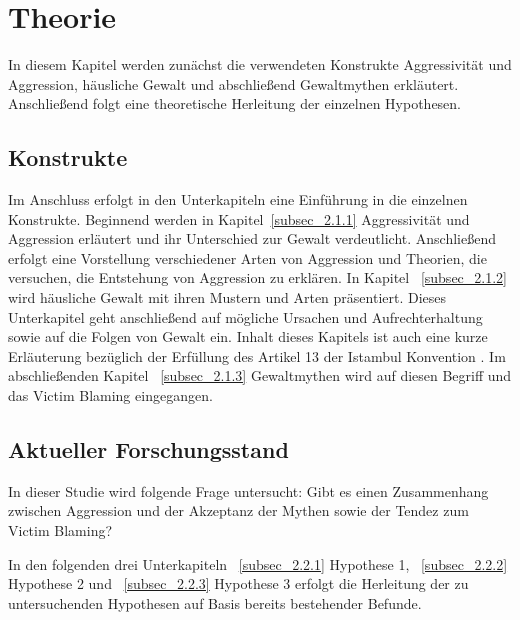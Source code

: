 

\chapter{Theorie}   \label{ch_2}
In diesem Kapitel werden zunächst die verwendeten Konstrukte Aggressivität und Aggression, häusliche Gewalt und abschließend Gewaltmythen erkläutert. Anschließend folgt eine theoretische Herleitung der einzelnen Hypothesen.

\section{Konstrukte}    \label{sec_2.1}
Im Anschluss erfolgt in den Unterkapiteln eine Einführung in die einzelnen Konstrukte. Beginnend werden in Kapitel~\ref{subsec_2.1.1} Aggressivität und Aggression erläutert und ihr Unterschied zur Gewalt verdeutlicht. Anschließend erfolgt eine Vorstellung verschiedener Arten von Aggression und Theorien, die versuchen, die Entstehung von Aggression zu erklären. In Kapitel ~\ref{subsec_2.1.2} wird häusliche Gewalt mit ihren Mustern und Arten präsentiert. Dieses Unterkapitel geht anschließend auf mögliche Ursachen und Aufrechterhaltung sowie auf die Folgen von Gewalt ein. Inhalt dieses Kapitels ist auch eine kurze Erläuterung bezüglich der Erfüllung des Artikel 13 der Istambul Konvention \parencite{Istambul_Konvention}. Im abschließenden Kapitel ~\ref{subsec_2.1.3} Gewaltmythen wird auf diesen Begriff und das Victim Blaming eingegangen.





\section{Aktueller Forschungsstand}   \label{sec_2.2}
In dieser Studie wird folgende Frage untersucht: Gibt es einen Zusammenhang zwischen Aggression und der Akzeptanz der Mythen sowie der Tendez zum Victim Blaming? 

In den folgenden drei Unterkapiteln ~\ref{subsec_2.2.1} Hypothese 1, ~\ref{subsec_2.2.2} Hypothese 2 und ~\ref{subsec_2.2.3} Hypothese 3 erfolgt die Herleitung der zu untersuchenden Hypothesen auf Basis bereits bestehender Befunde.



